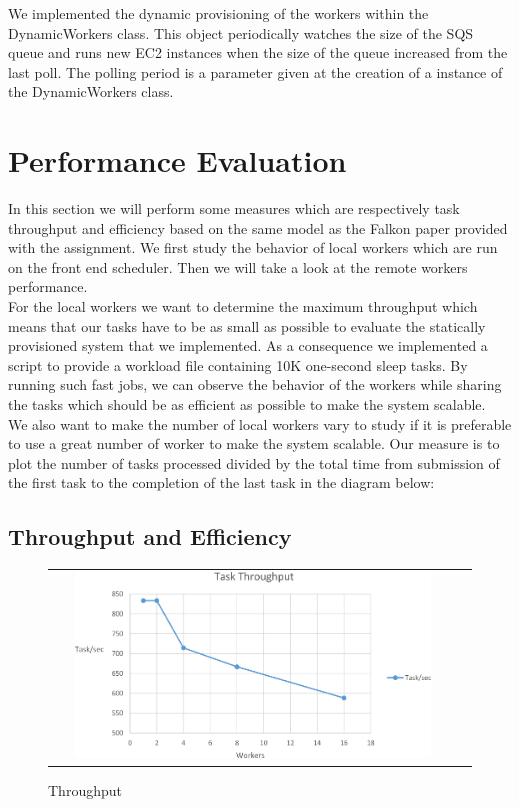\documentclass{article}
\begin{document}
We implemented the dynamic provisioning of the workers within the DynamicWorkers class. This object periodically watches the size of the SQS queue and runs new EC2 instances when the size of the queue increased from the last poll. The polling period is a parameter given at the creation of a instance of the DynamicWorkers class.\\


\section{Performance Evaluation}

In this section we will perform some measures which are respectively task throughput and efficiency based on the same model as the Falkon paper provided with the assignment. We first study the behavior of local workers which are run on the front end scheduler. Then we will take a look at the remote workers performance.\\


For the local workers we want to determine the maximum throughput which means that our tasks have to be as small as possible to evaluate the statically provisioned system that we implemented. As a consequence we implemented a script to provide a workload file containing 10K one-second sleep tasks. By running such fast jobs, we can observe the behavior of the workers while sharing the tasks which should be as efficient as possible to make the system scalable.\\

We also want to make the number of local workers vary to study if it is preferable to use a great number of worker to make the system scalable. Our measure is to plot the number of tasks processed divided by the total time from submission of the first task to the completion of the last task in the diagram below:


\subsection{Throughput and Efficiency}
\begin{figure}[H]
\centering
\begin{tabular}{cc}
\includegraphics[width=0.9\textwidth]{Throughput.png}
\end{tabular}
\caption{Throughput}
\end{figure}
\end{document}
